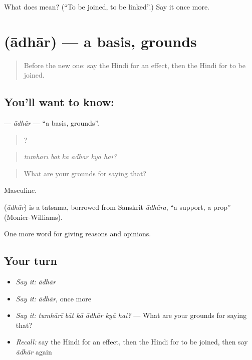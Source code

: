 \begin{tcolorbox}[breakable,colback=teal!4,colframe=teal!35!black,title={Before you move on}]
What does  mean? (\textquotedblleft{}To be joined, to be linked\textquotedblright{}.) Say it once more.
\end{tcolorbox}
\section[\texorpdfstring{\hi{आधार} (ādhār)}{आधार (ādhār)}]{ (ādhār) — a basis, grounds}

\label{lesson:HI-C343-adhar}



\begin{quote}
Before the new one: say the Hindi for an effect, then the Hindi for to be joined.
\end{quote}

\subsection*{You'll want to know: }
\textbf{} — \emph{ādhār} — \textquotedblleft{}a basis, grounds\textquotedblright{}.

\begin{quote}
     ?
\end{quote}

\begin{quote}
\emph{tumhārī bāt kā ādhār kyā hai?}
\end{quote}

\begin{quote}
What are your grounds for saying that?
\end{quote}

Masculine.

\begin{cousinweb}
\textbf{} (\emph{ādhār}) is a tatsama, borrowed from Sanskrit \emph{ādhāra}, \textquotedblleft{}a support, a prop\textquotedblright{} (Monier-Williams).
\end{cousinweb}

\begin{grammarlens}[title={What you've built}]
One more word for giving reasons and opinions.
\end{grammarlens}

\subsection*{Your turn}
\begin{itemize}
\raggedright
  \item \emph{Say it:} \emph{ādhār}
  \item \emph{Say it:} \emph{ādhār}, once more
  \item \emph{Say it:} \emph{tumhārī bāt kā ādhār kyā hai?} — What are your grounds for saying that?
  \item \emph{Recall:} say the Hindi for an effect, then the Hindi for to be joined, then say \emph{ādhār} again
\end{itemize}

